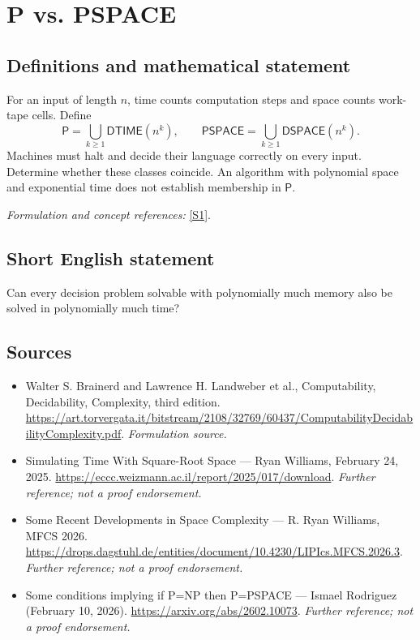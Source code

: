 \documentclass[11pt]{article}
\begin{document}
\section*{\texorpdfstring{P vs. PSPACE}{P vs. PSPACE}}\label{statement}
\subsection{Definitions and mathematical statement}
For an input of length $n$, time counts computation steps and space counts work-tape cells. Define
\[
 \mathsf P=\bigcup_{k\ge1}\mathsf{DTIME}(n^k),\qquad
 \mathsf{PSPACE}=\bigcup_{k\ge1}\mathsf{DSPACE}(n^k).
\]
Machines must halt and decide their language correctly on every input. Determine whether these classes coincide. An algorithm with polynomial space and exponential time does not establish membership in $\mathsf P$.
\par\smallskip\textit{Formulation and concept references:} \href{https://art.torvergata.it/bitstream/2108/32769/60437/ComputabilityDecidabilityComplexity.pdf}{[S1]}.

\subsection{Short English statement}
Can every decision problem solvable with polynomially much memory also be solved in polynomially much time?
\subsection{Sources}
\begin{itemize}
\item[S1]Walter S. Brainerd and Lawrence H. Landweber et al., Computability, Decidability, Complexity, third edition.
\url{https://art.torvergata.it/bitstream/2108/32769/60437/ComputabilityDecidabilityComplexity.pdf}.
\textit{Formulation source.}
\item[S2]Simulating Time With Square-Root Space — Ryan Williams, February 24, 2025.
\url{https://eccc.weizmann.ac.il/report/2025/017/download}.
\textit{Further reference; not a proof endorsement.}
\item[S3]Some Recent Developments in Space Complexity — R. Ryan Williams, MFCS 2026.
\url{https://drops.dagstuhl.de/entities/document/10.4230/LIPIcs.MFCS.2026.3}.
\textit{Further reference; not a proof endorsement.}
\item[S4]Some conditions implying if P=NP then P=PSPACE — Ismael Rodriguez (February 10, 2026).
\url{https://arxiv.org/abs/2602.10073}.
\textit{Further reference; not a proof endorsement.}
\end{itemize}
\end{document}
